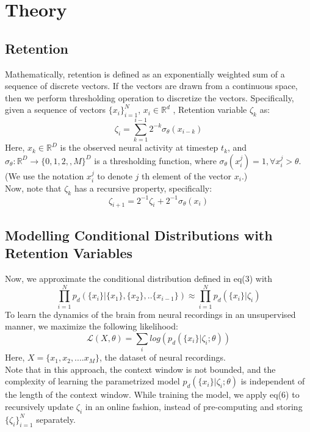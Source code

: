 



\section{Theory}

\subsection{Retention}
Mathematically, retention is defined as an exponentially weighted sum of a sequence of discrete vectors. If the vectors are drawn from a continuous space, then we perform thresholding operation to discretize the vectors. 
Specifically, given a sequence of vectors $\{x_i\}_{i=1}^N$, $x_i \in \mathbb{R}^d$ , Retention variable $ \zeta_k $ as:
\begin{equation}
    \zeta_i = \sum_{k=1}^{i-1} 2^{-k} \sigma_{\theta}(x_{i-k}) 
\end{equation}
Here, $x_k \in \mathbb{R}^D$ is the observed neural activity at timestep $t_k$, and $\sigma_{\theta}: \mathbb{R}^D \rightarrow \{0,1,2,,M\}^D $ is a thresholding function, where $\sigma_{\theta}(x_i^{j}) = 1, \forall x_i^{j} > \theta $. (We use the notation $x_i^{j}$ to denote $j$ th element of the vector $x_i$.)
\\

Now, note that $\zeta_k $ has a recursive property, specifically:
\begin{equation}
    \zeta_{i+1} = 2^{-1}\zeta_i +  2^{-1}\sigma_{\theta}(x_i)
\end{equation}
\subsection{Modelling Conditional Distributions with Retention Variables}
Now, we approximate the conditional distribution defined in eq(3) with 
\begin{equation}
   \prod_{i=1}^{N} p_d(\{x_{i}\}| \{x_1\},\{x_2\},..\{x_{i-1}\}) 
   \approx  \prod_{i=1}^{N} p_d(\{x_{i}\}|\zeta_i)
\end{equation}
To learn the dynamics of the brain from neural recordings in an unsupervised manner, we maximize the following likelihood:
\begin{equation}
    \mathcal{L}(X,\theta) = \sum_i log(p_d(\{x_{i}\}|\zeta_i;\theta))
\end{equation}
Here, $X = \{x_1,x_2,....x_M\}$, the dataset of neural recordings. \\

Note that in this approach, the context window is not bounded, and the complexity of learning the parametrized model $p_d(\{x_{i}\}|\zeta_i;\theta)$ is independent of the length of the context window. While training the model, we apply eq(6) to recursively update $\zeta_i$ in an online fashion, instead of pre-computing and storing $\{\zeta_i\}_{i=1}^N$ separately.
 \\

